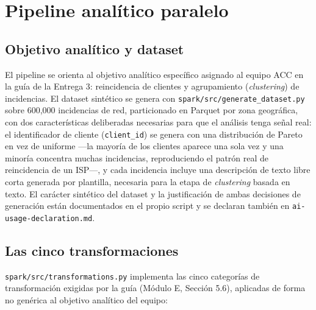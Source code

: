 \section{Pipeline analítico paralelo}
\label{sec:pipeline-paralelo}

\subsection{Objetivo analítico y dataset}

El pipeline se orienta al objetivo analítico específico asignado al equipo ACC en la guía de la
Entrega 3: reincidencia de clientes y agrupamiento (\emph{clustering}) de incidencias. El dataset
sintético se genera con \texttt{spark/src/generate\_dataset.py} sobre 600{,}000 incidencias de
red, particionado en Parquet por zona geográfica, con dos características deliberadas necesarias
para que el análisis tenga señal real: el identificador de cliente (\texttt{client\_id}) se genera
con una distribución de Pareto en vez de uniforme —la mayoría de los clientes aparece una sola vez
y una minoría concentra muchas incidencias, reproduciendo el patrón real de reincidencia de un
ISP—, y cada incidencia incluye una descripción de texto libre corta generada por plantilla,
necesaria para la etapa de \emph{clustering} basada en texto. El carácter sintético del dataset y
la justificación de ambas decisiones de generación están documentados en el propio script y se
declaran también en \texttt{ai-usage-declaration.md}.

\subsection{Las cinco transformaciones}

\texttt{spark/src/transformations.py} implementa las cinco categorías de transformación exigidas
por la guía (Módulo E, Sección 5.6), aplicadas de forma no genérica al objetivo analítico del
equipo:

